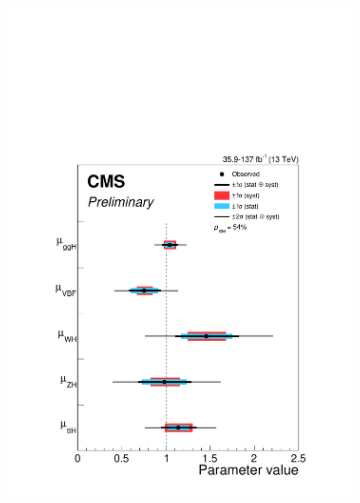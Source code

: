 \begin{figure}[htbp]
  \centering
  \begin{subfigure}[htbp]{0.48\textwidth}
    \centering
    \includegraphics[width=\textwidth]{figures_and_tables/theory/signal_strength_modifier_prod.pdf}
    \caption{ }
  \label{signal_strength_modifier_prod}
  \end{subfigure}
  \hfill
  \begin{subfigure}[htbp]{0.48\textwidth}
    \centering

\end{subfigure}
\end{figure}
